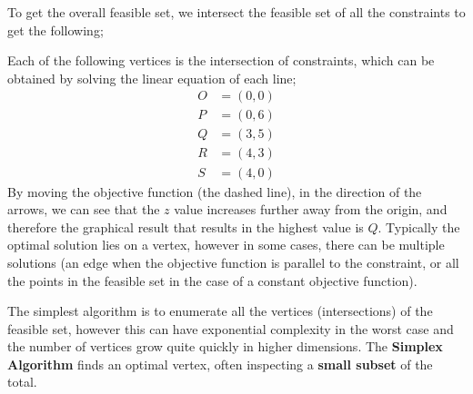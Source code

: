\documentclass[a4paper, 12pt]{article}
\begin{document}
                To get the overall feasible set, we intersect the feasible set of all the constraints to get the following;
                \begin{center}
                \end{center}
                Each of the following vertices is the intersection of constraints, which can be obtained by solving the linear equation of each line;
                \begin{align*}
                    O & = (0, 0) \\
                    P & = (0, 6) \\
                    Q & = (3, 5) \\
                    R & = (4, 3) \\
                    S & = (4, 0)
                \end{align*}
                By moving the objective function (the dashed line), in the direction of the arrows, we can see that the $z$ value increases further away from the origin, and therefore the graphical result that results in the highest value is $Q$.
                Typically the optimal solution lies on a vertex, however in some cases, there can be multiple solutions (an edge when the objective function is parallel to the constraint, or all the points in the feasible set in the case of a constant objective function).
                \medskip

                The simplest algorithm is to enumerate all the vertices (intersections) of the feasible set, however this can have exponential complexity in the worst case and the number of vertices grow quite quickly in higher dimensions.
                The \textbf{Simplex Algorithm} finds an optimal vertex, often inspecting a \textbf{small subset} of the total.
                \medskip
\end{document}
